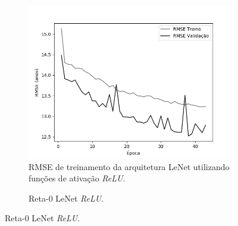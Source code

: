 
	\begin{figure}[hb!]
		\caption{Resultados do treinamento e teste da CNN LeNet.}\label{fig:lenet-abordagem1}
		\begin{subfigure}[hb]{0.5\linewidth}
			\caption{RMSE de treinamento da arquitetura LeNet utilizando funções de ativação \emph{ReLU}.}
			\label{fig:redeneuralbiologica}
			\includegraphics[width=\linewidth]{img/graficos/history/lenet/fig-history-image-treat-2-lenet-relu-rmse.png}%
		\end{subfigure}%
		\begin{subfigure}[hb]{0.5\linewidth}
			\caption{Reta-0 LeNet \emph{ReLU}.}
			\label{fig:redeneuralbiologica}

\end{subfigure}
\end{figure}
